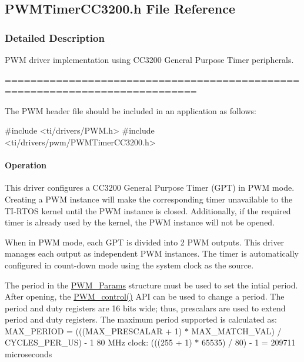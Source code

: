 \subsection{P\+W\+M\+Timer\+C\+C3200.\+h File Reference}
\label{_p_w_m_timer_c_c3200_8h}


\subsubsection{Detailed Description}
P\+W\+M driver implementation using C\+C3200 General Purpose Timer peripherals. 

============================================================================

The P\+W\+M header file should be included in an application as follows\+: 
\begin{DoxyCode}
\textcolor{preprocessor}{#include <ti/drivers/PWM.h>}
\textcolor{preprocessor}{#include <ti/drivers/pwm/PWMTimerCC3200.h>}
\end{DoxyCode}


\paragraph*{Operation}

This driver configures a C\+C3200 General Purpose Timer (G\+P\+T) in P\+W\+M mode. Creating a P\+W\+M instance will make the corresponding timer unavailable to the T\+I-\/\+R\+T\+O\+S kernel until the P\+W\+M instance is closed. Additionally, if the required timer is already used by the kernel, the P\+W\+M instance will not be opened.

When in P\+W\+M mode, each G\+P\+T is divided into 2 P\+W\+M outputs. This driver manages each output as independent P\+W\+M instances. The timer is automatically configured in count-\/down mode using the system clock as the source.

The period in the \hyperlink{struct_p_w_m___params}{P\+W\+M\+\_\+\+Params} structure must be used to set the intial period. After opening, the \hyperlink{_p_w_m_8h_ade999f5b12997479efa1ac85aaf46ef5}{P\+W\+M\+\_\+control()} A\+P\+I can be used to change a period. The period and duty registers are 16 bits wide; thus, prescalars are used to extend period and duty registers. The maximum period supported is calculated as\+: M\+A\+X\+\_\+\+P\+E\+R\+I\+O\+D = (((M\+A\+X\+\_\+\+P\+R\+E\+S\+C\+A\+L\+A\+R + 1) $\ast$ M\+A\+X\+\_\+\+M\+A\+T\+C\+H\+\_\+\+V\+A\+L) / C\+Y\+C\+L\+E\+S\+\_\+\+P\+E\+R\+\_\+\+U\+S) -\/ 1 80 M\+Hz clock\+: (((255 + 1) $\ast$ 65535) / 80) -\/ 1 = 209711 microseconds

